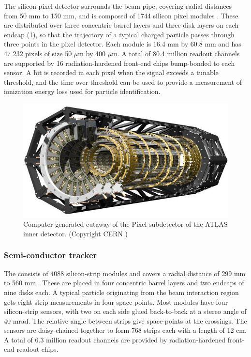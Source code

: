The silicon pixel detector surrounds the beam pipe, covering radial distances from 50 mm to 150 mm, and is composed of 1744 silicon pixel modules \cite{Aad:2008zz}.
These are distributed over three concentric barrel layers and three disk layers on each endcap (\cref{fig:atlas_pixel}), so that the trajectory of a typical charged particle passes through three points in the pixel detector.
Each module is 16.4 mm by 60.8 mm and has 47 232 pixels of size 50 $\mu$m by 400 $\mu$m.
A total of 80.4 million readout channels are supported by 16 radiation-hardened front-end chips bump-bonded to each sensor.
A hit is recorded in each pixel when the signal exceeds a tunable threshold, and the time over threshold can be used to provide a measurement of ionization energy loss \dEdx used for particle identification.

\begin{figure}[t]
\includegraphics{pixel.jpg}
\caption{Computer-generated cutaway of the Pixel subdetector of the ATLAS inner detector. (Copyright CERN \cite{Pequenao:1095925})}
\label{fig:atlas_pixel}
\end{figure}


\subsubsection{Semi-conductor tracker}

The \sct consists of 4088 silicon-strip modules and covers a radial distance of 299 mm to 560 mm \cite{Aad:2014mta}.
These are placed in four concentric barrel layers and two endcaps of nine disks each.
A typical particle originating from the beam interaction region gets eight strip measurements in four space-points.
Most modules have four silicon-strip sensors, with two on each side glued back-to-back at a stereo angle of 40 mrad.
The relative angle between strips give space-points at the crossings.
The sensors are daisy-chained together to form 768 strips each with a length of 12 cm.
A total of 6.3 million readout channels are provided by radiation-hardened front-end readout chips.

